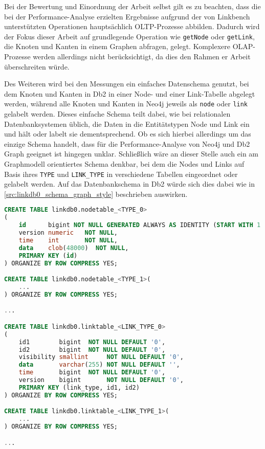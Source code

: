 Bei der Bewertung und Einordnung der Arbeit selbst gilt es zu beachten, dass die bei der Performance-Analyse erzielten Ergebnisse aufgrund der von Linkbench unterstützten Operationen hauptsächlich OLTP-Prozesse abbilden. Dadurch wird der Fokus dieser Arbeit auf grundlegende Operation wie \texttt{getNode} oder \texttt{getLink}, die Knoten und Kanten in einem Graphen abfragen, gelegt. Komplexere OLAP-Prozesse werden allerdings nicht berücksichtigt, da dies den Rahmen er Arbeit überschreiten würde. 

Des Weiteren wird bei den Messungen ein einfaches Datenschema genutzt, bei dem Knoten und Kanten in Db2 in einer Node- und einer Link-Tabelle abgelegt werden, während alle Knoten und Kanten in Neo4j jeweils als \texttt{node} oder \texttt{link} gelabelt werden. Dieses einfache Schema teilt dabei, wie bei relationalen Datenbanksystemen üblich, die Daten in die Entitätstypen Node und Link ein und hält oder labelt sie dementsprechend. Ob es sich hierbei allerdings um das einzige Schema handelt, dass für die Performance-Analyse von Neo4j und Db2 Graph geeignet ist hingegen unklar. Schließlich wäre an dieser Stelle auch ein am Graphmodell orientiertes Schema denkbar, bei dem die Nodes und Links auf Basis ihres \texttt{TYPE} und \texttt{LINK\_TYPE} in verschiedene Tabellen eingeordnet oder gelabelt werden. Auf das Datenbankschema in Db2 würde sich dies dabei wie in \autoref{src:linkdb0_schema_graph_style} beschrieben auswirken. 

\begin{lstlisting}[label=src:linkdb0_schema_graph_style,caption={Alternatives Datenbankschema für Db2},language=SQL]
CREATE TABLE linkdb0.nodetable_<TYPE_0>
(
    id      bigint NOT NULL GENERATED ALWAYS AS IDENTITY (START WITH 1 INCREMENT BY 1),
    version numeric   NOT NULL,
    time    int       NOT NULL,
    data    clob(48000)  NOT NULL,
    PRIMARY KEY (id)
) ORGANIZE BY ROW COMPRESS YES;

CREATE TABLE linkdb0.nodetable_<TYPE_1>(
    ...
) ORGANIZE BY ROW COMPRESS YES;

...

CREATE TABLE linkdb0.linktable_<LINK_TYPE_0>
(
    id1        bigint  NOT NULL DEFAULT '0',
    id2        bigint  NOT NULL DEFAULT '0',
    visibility smallint     NOT NULL DEFAULT '0',
    data       varchar(255) NOT NULL DEFAULT '',
    time       bigint  NOT NULL DEFAULT '0',
    version    bigint       NOT NULL DEFAULT '0',
    PRIMARY KEY (link_type, id1, id2)
) ORGANIZE BY ROW COMPRESS YES;

CREATE TABLE linkdb0.linktable_<LINK_TYPE_1>(
    ...
) ORGANIZE BY ROW COMPRESS YES;

...
\end{lstlisting}





